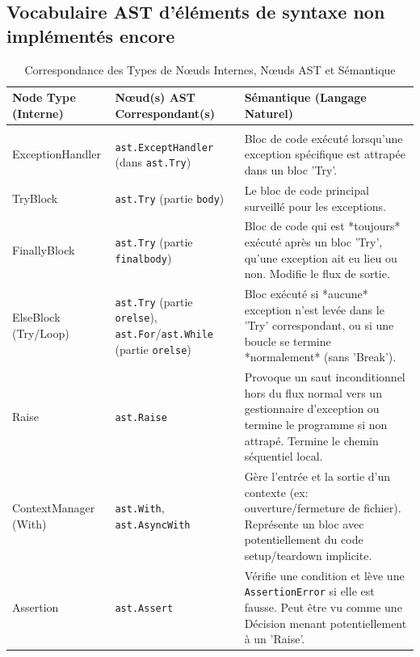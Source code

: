 \documentclass[11pt,a4paper]{article}
\begin{document}
\subsection*{Vocabulaire AST d'éléments de syntaxe non implémentés encore}

\begin{longtable}{| p{4cm} | p{4cm} | p{7cm} |}
\caption{Correspondance des Types de Nœuds Internes, Nœuds AST et Sémantique}\label{tab:node-types-TODO}\\
\hline
\textbf{Node Type (Interne)} & \textbf{Nœud(s) AST Correspondant(s)} & \textbf{Sémantique (Langage Naturel)} \\
\hline
\endfirsthead
\hline
\endfoot
\hline
\multicolumn{3}{r}{\small\slshape Table suite en page suivante} \\
\hline
\endlastfoot
ExceptionHandler & \texttt{ast.ExceptHandler} (dans \texttt{ast.Try}) & Bloc de code exécuté lorsqu'une exception spécifique est attrapée dans un bloc 'Try'. \\ \hline
TryBlock & \texttt{ast.Try} (partie \texttt{body}) & Le bloc de code principal surveillé pour les exceptions. \\ \hline
FinallyBlock & \texttt{ast.Try} (partie \texttt{finalbody}) & Bloc de code qui est *toujours* exécuté après un bloc 'Try', qu'une exception ait eu lieu ou non. Modifie le flux de sortie. \\ \hline
ElseBlock (Try/Loop) & \texttt{ast.Try} (partie \texttt{orelse}), \texttt{ast.For}/\texttt{ast.While} (partie \texttt{orelse}) & Bloc exécuté si *aucune* exception n'est levée dans le 'Try' correspondant, ou si une boucle se termine *normalement* (sans 'Break'). \\ \hline
Raise & \texttt{ast.Raise} & Provoque un saut inconditionnel hors du flux normal vers un gestionnaire d'exception ou termine le programme si non attrapé. Termine le chemin séquentiel local. \\ \hline
ContextManager (With) & \texttt{ast.With}, \texttt{ast.AsyncWith} & Gère l'entrée et la sortie d'un contexte (ex: ouverture/fermeture de fichier). Représente un bloc avec potentiellement du code setup/teardown implicite. \\ \hline
Assertion & \texttt{ast.Assert} & Vérifie une condition et lève une \texttt{AssertionError} si elle est fausse. Peut être vu comme une Décision menant potentiellement à un 'Raise'. \\ \hline

\end{longtable}
\end{document}
